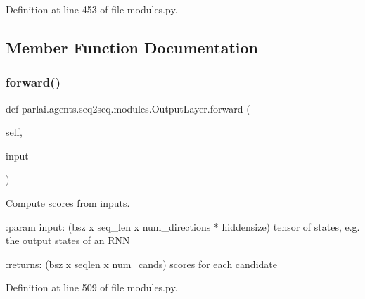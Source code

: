 Definition at line 453 of file modules.\+py.



\subsection{Member Function Documentation}
\mbox{\label{classparlai_1_1agents_1_1seq2seq_1_1modules_1_1OutputLayer_a730001f010633b53df7f7d96a75d8812}} 
\subsubsection{\texorpdfstring{forward()}{forward()}}
{\footnotesize\ttfamily def parlai.\+agents.\+seq2seq.\+modules.\+Output\+Layer.\+forward (\begin{DoxyParamCaption}\item[{}]{self,  }\item[{}]{input }\end{DoxyParamCaption})}

\begin{DoxyVerb}Compute scores from inputs.

:param input: (bsz x seq_len x num_directions * hiddensize) tensor of
       states, e.g. the output states of an RNN

:returns: (bsz x seqlen x num_cands) scores for each candidate
\end{DoxyVerb}
 

Definition at line 509 of file modules.\+py.



